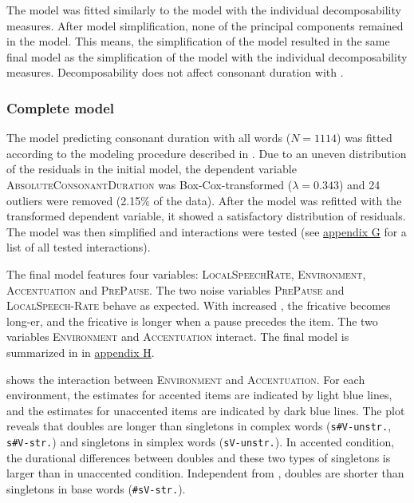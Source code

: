 The model was fitted similarly to the model with the individual decomposability measures. After model simplification, none of the principal components remained in the model. This means, the simplification of the model resulted in the same final model as the simplification of the model with the individual decomposability measures. Decomposability does not affect consonant duration with .


\subsubsection{Complete model}

The model predicting consonant duration with all words ($N=1114$) was fitted according to the modeling procedure described in . Due to an uneven distribution of the residuals in the initial model, the dependent variable \textsc{AbsoluteConsonantDuration} was Box-Cox-transformed ($\lambda = 0.343$) and 24 outliers were removed (2.15\% of the data). After the model was refitted with the transformed dependent variable, it showed a satisfactory distribution of residuals.  The model was then simplified and interactions were tested (see \hyperref[Appendix G Summaries of tested interactions in experimental study]{appendix G} for a list of all tested interactions). 

The final model features four variables: \textsc{LocalSpeechRate}, \textsc{Environment}, \textsc{Accentuation} and \textsc{PrePause}. The two noise variables \textsc{PrePause} and \textsc{LocalSpeech-Rate} behave as expected. With increased , the fricative becomes long-er, and the fricative is longer when a pause precedes the item.
 The two variables \textsc{Environment} and \textsc{Accentuation} interact. The final model is summarized in  in \hyperref[Appendix H: Model Summaries Experiment]{appendix H}.




 shows the interaction between \textsc{Environment} and \textsc{Accentuation}. For each environment, the estimates for accented items are indicated by light blue lines, and the estimates for unaccented items are indicated by dark blue lines.
The plot reveals that doubles are longer than singletons in complex words (\texttt{s\#V-unstr.}, \texttt{s\#V-str.}) and singletons in simplex words (\texttt{sV-unstr.}). In accented condition, the durational differences between doubles and these two types of singletons is larger than in unaccented condition. 
Independent from , doubles are shorter than singletons in base words (\texttt{\#sV-str.}).



